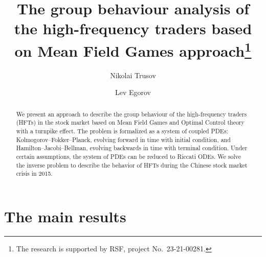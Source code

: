 \documentclass[12pt]{llncs}
\begin{document}
\fi

\title{The group behaviour analysis of the high-frequency traders based on Mean Field Games approach\thanks{The research is supported by RSF, project No.~23-21-00281.}}

\author{Nikolai Trusov   \and  Lev Egorov
}

\maketitle

\begin{abstract}
We present an approach to describe the group behaviour of the high-frequency traders (HFTs) in the stock market based on Mean Field Games and Optimal Control theory with a turnpike effect. The problem is formalized as a system of coupled PDEs: Kolmogorov--Fokker--Planck, evolving forward in time with initial condition, and Hamilton--Jacobi--Bellman, evolving backwards in time with terminal condition. Under certain assumptions, the system of PDEs can be reduced to Riccati ODEs. We solve the inverse problem to describe the behavior of HFTs during the Chinese stock market crisis in 2015.

\end{abstract}


\section{The main results} %
\end{document}
